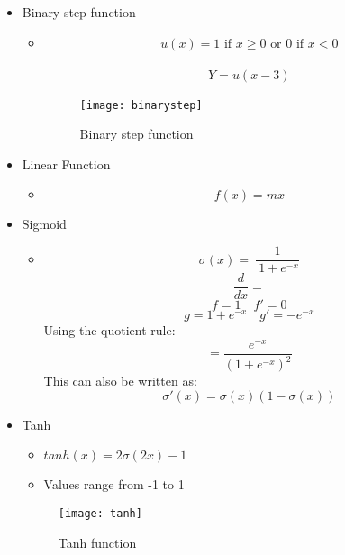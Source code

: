 \documentclass{article}
\begin{document}
\begin{itemize}
    \item Binary step function
    \begin{itemize}
        \item \begin{align*}
            u(x) = 	1 \mbox{ if }  x \geq 0 \mbox{ or } 0 \mbox{ if } x <  0
        \end{align*}


     \begin{align*}
            Y = u(x-3)
        \end{align*}
        \begin{figure}[h!]
            \centering
            \texttt{[image: binarystep]}
            \caption{Binary step function}
        \end{figure}
    \end{itemize}


    \item Linear Function
        \begin{itemize}
            \item \begin{equation*}
            f(x) = mx
        \end{equation*}
        \end{itemize}


    \item Sigmoid
        \begin{itemize}
            \item
            $$\sigma(x)  =\:\frac{1}{\:1+e^{-x}}$$
            $$\frac{d}{dx} =$$
            $$f  = 1 \quad f' = 0$$
            $$g  = 1 + e^{-x} \quad g' = -e^{-x}$$
            Using the quotient rule:
            $$= \frac{e^{-x}}{{(1+e^{-x})}^2}$$
            This can also be written as:
            $$\sigma'(x) = \sigma(x)(1-\sigma(x))$$

        \end{itemize}


    \item Tanh
        \begin{itemize}
        \item $tanh(x) = 2\sigma(2x)-1$
        \item Values range from -1 to 1
        \end{itemize}
        \begin{figure}[h!]
            \centering
            \texttt{[image: tanh]}
            \caption{Tanh function}
        \end{figure}



\end{itemize}
\end{document}
